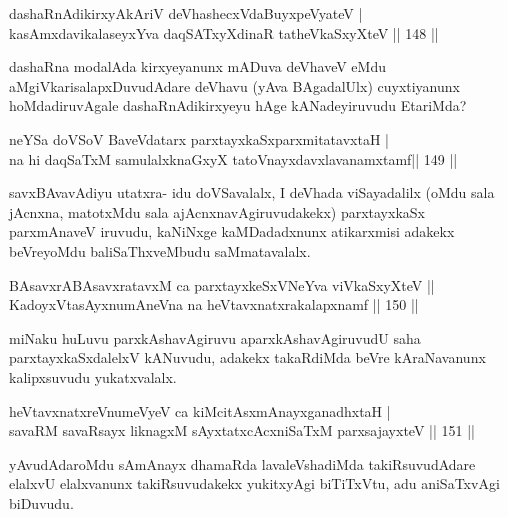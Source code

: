\begin{shl}
dashaRnAdikirxyAkAriV deVhashecxVdaBuyxpeVyateV | \\
kasAmxdavikalaseyxYva daqSATxyXdinaR tatheVkaSxyXteV \hfill||  148 ||  
\end{shl}

\begin{artha}
dashaRna modalAda kirxyeyanunx mADuva deVhaveV eMdu aMgiVkarisalapxDuvudAdare deVhavu (yAva BAgadalUlx) cuyxtiyanunx hoMdadiruvAgale dashaRnAdikirxyeyu hAge kANadeyiruvudu EtariMda?
\end{artha}


\begin{shl}
neYSa doVSoV BaveVdatarx parxtayxkaSxparxmitatavxtaH | \\
na hi daqSaTxM samulalxknaGxyX tatoV\s nayxdavxlavanamxtamf\hfill||  149 ||  
\end{shl}

\begin{artha}
savxBAvavAdiyu utatxra- idu doVSavalalx, I deVhada viSayadalilx (oMdu sala jAcnxna, matotxMdu sala ajAcnxnavAgiruvudakekx) parxtayxkaSx parxmAnaveV iruvudu, kaNiNxge kaMDadadxnunx atikarxmisi adakekx beVreyoMdu baliSaThxveMbudu saMmatavalalx.
\end{artha}

\begin{shl}
BAsavxrABAsavxratavxM ca parxtayxkeSxVNeYva viVkaSxyXteV ||  \\
KadoyxVtasAyxnumAneVna na heVtavxnatxrakalapxnamf \hfill||  150 ||  
\end{shl}

\begin{artha}
miNaku huLuvu parxkAshavAgiruvu aparxkAshavAgiruvudU saha parxtayxkaSxdalelxV kANuvudu, adakekx takaRdiMda beVre kAraNavanunx kalipxsuvudu yukatxvalalx.
\end{artha}

\begin{shl}
heVtavxnatxreV\s numeVyeV ca kiMcitAsxmAnayxganadhxtaH | \\
savaRM savaRsayx liknagxM sAyxtatxcAcxniSaTxM parxsajayxteV \hfill||  151 ||  
\end{shl}

\begin{artha}
yAvudAdaroMdu sAmAnayx dhamaRda lavaleVshadiMda takiRsuvudAdare elalxvU elalxvanunx takiRsuvudakekx yukitxyAgi biTiTxVtu, adu aniSaTxvAgi biDuvudu.
\end{artha}

